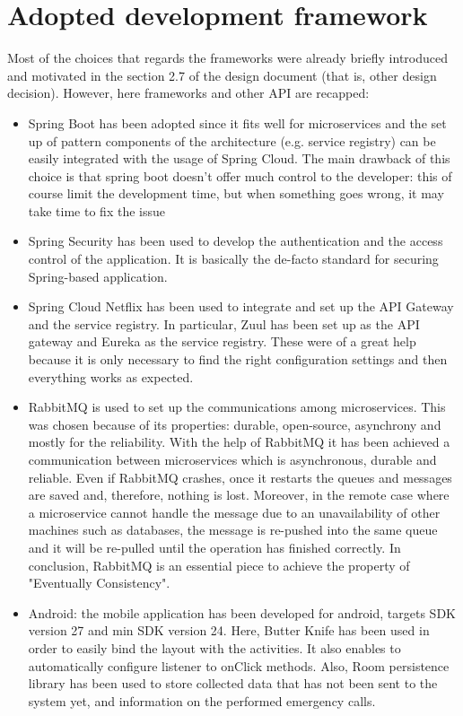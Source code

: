 \section{Adopted development framework}
Most of the choices that regards the frameworks were already briefly introduced and motivated in the
section 2.7 of the design document (that is, other design decision). 
However, here frameworks and other API are recapped:

\begin{itemize}

\item Spring Boot has been adopted since it fits well for microservices and the set up of pattern components
of the architecture (e.g. service registry) can be easily integrated with the usage of Spring Cloud.
The main drawback of this choice is that spring boot doesn't offer much control to the developer: this of
course limit the development time, but when something goes wrong, it may take time to fix the issue

\item Spring Security has been used to develop the authentication and the access control of the application.
It is basically the de-facto standard for securing Spring-based application. 

\item Spring Cloud Netflix has been used to integrate and set up the API Gateway and the service registry.
In particular, Zuul has been set up as the API gateway and Eureka as the service registry. 
These were of a great help because it is only necessary to find the right configuration settings and then everything works as expected.

\item RabbitMQ is used to set up the communications among microservices. This was chosen because of its properties: durable, 
open-source, asynchrony and mostly for the reliability. With the help of RabbitMQ it has been achieved a communication 
between microservices which is asynchronous, durable and reliable. Even if RabbitMQ crashes, once it restarts the queues 
and messages are saved and, therefore, nothing is lost. Moreover, in the remote case where a microservice cannot handle 
the message due to an unavailability of other machines such as databases, the message is re-pushed into the same queue and it 
will be re-pulled until the operation has finished correctly. In conclusion, RabbitMQ is an essential piece to achieve the property 
of "Eventually Consistency".

\item Android: the mobile application has been developed for android, targets SDK version 27 and min SDK version 24. Here, Butter Knife has been used in order to easily bind the layout with the activities. It also enables to automatically configure listener to onClick methods. Also, Room persistence library has been used to store
collected data that has not been sent to the system yet, and information on the performed emergency calls.

\end{itemize}


